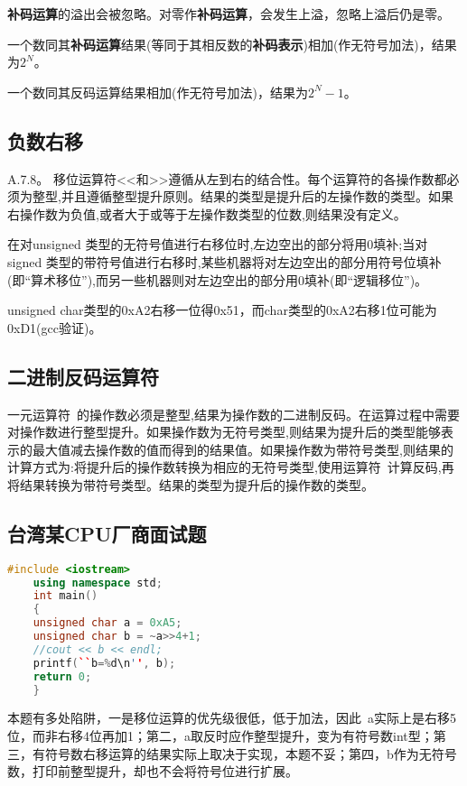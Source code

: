\textbf{补码运算}的溢出会被忽略。对零作\textbf{补码运算}，会发生上溢，忽略上溢后仍是零。

一个数同其\textbf{补码运算}结果(等同于其相反数的\textbf{补码表示})相加(作无符号加法)，结果为$2^N$。

一个数同其反码运算结果相加(作无符号加法)，结果为$2^N-1$。


\subsection{负数右移}
\cite{krc}A.7.8。
移位运算符<<和>>遵循从左到右的结合性。每个运算符的各操作数都必须为整型,并且遵循整型提升原则。结果的类型是提升后的左操作数的类型。如果右操作数为负值,或者大于或等于左操作数类型的位数,则结果没有定义。

在对unsigned 类型的无符号值进行右移位时,左边空出的部分将用0填补;当对 signed 类型的带符号值进行右移时,某些机器将对左边空出的部分用符号位填补(即“算术移位”),而另一些机器则对左边空出的部分用0填补(即“逻辑移位”)。 

unsigned char类型的0xA2右移一位得0x51，而char类型的0xA2右移1位可能为0xD1(gcc验证)。

\subsection{二进制反码运算符}
一元运算符~的操作数必须是整型,结果为操作数的二进制反码。在运算过程中需要对操作数进行整型提升。如果操作数为无符号类型,则结果为提升后的类型能够表示的最大值减去操作数的值而得到的结果值。如果操作数为带符号类型,则结果的计算方式为:将提升后的操作数转换为相应的无符号类型,使用运算符~计算反码,再将结果转换为带符号类型。结果的类型为提升后的操作数的类型。


\subsection{台湾某CPU厂商面试题}
\begin{lstlisting}[language=C++]
    #include <iostream>
    using namespace std;
    int main()
    {
	unsigned char a = 0xA5;
	unsigned char b = ~a>>4+1;
	//cout << b << endl;
	printf(``b=%d\n'', b);
	return 0;
    }
\end{lstlisting}

本题有多处陷阱，一是移位运算的优先级很低，低于加法，因此~a实际上是右移5位，而非右移4位再加1；第二，a取反时应作整型提升，变为有符号数int型；第三，有符号数右移运算的结果实际上取决于实现，本题不妥；第四，b作为无符号数，打印前整型提升，却也不会将符号位进行扩展。

